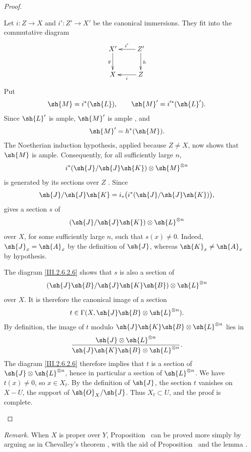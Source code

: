 \begin{proof}
\begin{env}[2.6.2.5]
Let $i:Z\to X$ and $i':Z'\to X'$ be the canonical immersions.
They fit into the commutative diagram
\[
  \xymatrix{
    X'\ar[d]_g &
    Z'\ar[l]_{i'}\ar[d]^h\\
    X &
    Z\ar[l]^{i}
  }
\]
Put
\[
  \sh{M}=i^*(\sh{L}),
  \qquad
  \sh{M}'=i'^*(\sh{L}').
\]
Since $\sh{L}'$ is ample, $\sh{M}'$ is ample
, and
\[
  \sh{M}'=h^*(\sh{M}).
\]
The Noetherian induction hypothesis, applied because $Z\neq X$, now
shows that $\sh{M}$ is ample.
Consequently, for all sufficiently large $n$,
\[
  i^*(\sh{J}/\sh{J}\sh{K})\otimes\sh{M}^{\otimes n}
\]
is generated by its sections over $Z$ .
Since
\[
  \sh{J}/\sh{J}\sh{K}
  =
  i_*\bigl(i^*(\sh{J}/\sh{J}\sh{K})\bigr),
\]
 gives a section $s$ of
\[
  (\sh{J}/\sh{J}\sh{K})\otimes\sh{L}^{\otimes n}
\]
over $X$, for some sufficiently large $n$, such that $s(x)\neq0$.
Indeed, $\sh{J}_x=\sh{A}_x$ by the definition of $\sh{J}$, whereas
$\sh{K}_x\neq\sh{A}_x$ by hypothesis.

The diagram \eqref{III.2.6.2.6} shows that $s$ is also a section of
\[
  (\sh{J}\sh{B}/\sh{J}\sh{K}\sh{B})
  \otimes\sh{L}^{\otimes n}
\]
over $X$.
It is therefore the canonical image of a section
\[
  t\in\Gamma(X,\sh{J}\sh{B}\otimes\sh{L}^{\otimes n}).
\]
By definition, the image of $t$ modulo
$\sh{J}\sh{K}\sh{B}\otimes\sh{L}^{\otimes n}$ lies in
\[
  \frac{\sh{J}\otimes\sh{L}^{\otimes n}}
       {\sh{J}\sh{K}\sh{B}\otimes\sh{L}^{\otimes n}}.
\]
The diagram \eqref{III.2.6.2.6} therefore implies that $t$ is a section
of $\sh{J}\otimes\sh{L}^{\otimes n}$, hence in particular a section of
$\sh{L}^{\otimes n}$.
We have $t(x)\neq0$, so $x\in X_t$.
By the definition of $\sh{J}$, the section $t$ vanishes on $X-U$, the
support of $\sh{O}_X/\sh{J}$.
Thus $X_t\subset U$, and the proof is complete.
\end{env}
\end{proof}


\begin{env}[2.6.3]
\label{III.2.6.3}
\emph{Remark.}
When $X$ is proper over $Y$, Proposition~ can be proved
more simply by arguing as in Chevalley's theorem
, with the aid of Proposition~ and
the lemma .
\end{env}
